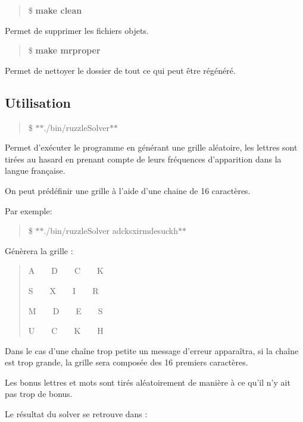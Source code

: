 \begin{quotation}
\$ {\bfseries make clean}

\end{quotation}


Permet de supprimer les fichiers objets.

\begin{quotation}
\$ {\bfseries make mrproper}

\end{quotation}


Permet de nettoyer le dossier de tout ce qui peut être régénéré.

\subsection*{Utilisation}

\begin{quotation}
\$ $\ast$$\ast$./bin/ruzzle\-Solver$\ast$$\ast$

\end{quotation}


Permet d'exécuter le programme en générant une grille aléatoire, les lettres sont tirées au hasard en prenant compte de leurs fréquences d'apparition dans la langue française.

On peut prédéfinir une grille à l'aide d'une chaine de 16 caractères.

Par exemple\-:

\begin{quotation}
\$ $\ast$$\ast$./bin/ruzzle\-Solver adcksxirmdesuckh$\ast$$\ast$

\end{quotation}


Génèrera la grille \-:

\begin{quotation}
A~~~~D~~~~C~~~~K

S~~~~X~~~~I~~~~R

M~~~~D~~~~E~~~~S

U~~~~C~~~~K~~~~H

\end{quotation}


Dans le cas d'une chaîne trop petite un message d'erreur apparaîtra, si la chaîne est trop grande, la grille sera composée des 16 premiers caractères.

Les bonus lettres et mots sont tirés aléatoirement de manière à ce qu'il n'y ait pas trop de bonus.

Le résultat du solver se retrouve dans \-:

